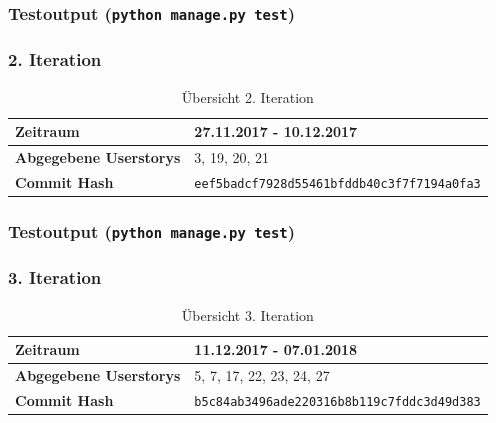 \documentclass[accentcolor=tud9c,12pt,paper=a4]{tudreport}
\begin{document}
	\subsubsection{Testoutput (\texttt{python manage.py test})}
	

	\subsubsection{2. Iteration}
	\begin{table}[H]
	\begin{center}
		\begin{tabular}{| l | l |}
			\hline
			\textbf{Zeitraum} & 27.11.2017 - 10.12.2017\\\hline
			\textbf{Abgegebene Userstorys} & 3, 19, 20, 21\\\hline
			\textbf{Commit Hash} & \texttt{eef5badcf7928d55461bfddb40c3f7f7194a0fa3} \\\hline
		\end{tabular}
		\caption{Übersicht 2. Iteration}
	\end{center}
	\end{table}
	\subsubsection{Testoutput (\texttt{python manage.py test})}
	

	\subsubsection{3. Iteration}
	\begin{table}[H]
	\begin{center}
		\begin{tabular}{| l | l |}
			\hline
			\textbf{Zeitraum} & 11.12.2017 - 07.01.2018\\\hline
			\textbf{Abgegebene Userstorys} & 5, 7, 17, 22, 23, 24, 27\\\hline
			\textbf{Commit Hash} & \texttt{b5c84ab3496ade220316b8b119c7fddc3d49d383} \\\hline
		\end{tabular}
		\caption{Übersicht 3. Iteration}
	\end{center}
	\end{table}
\end{document}
